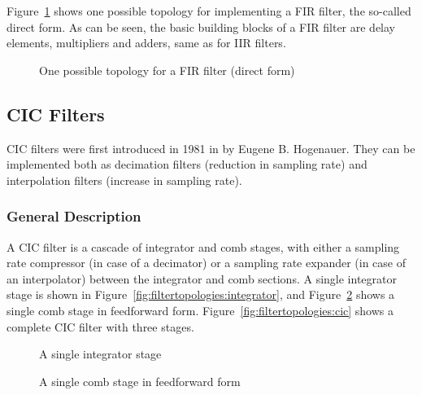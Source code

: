 Figure~\ref{fig:filtertopologies:fir}   shows   one  possible   topology   for
implementing a  FIR filter,  the so-called  direct form. As  can be  seen, the
basic building  blocks of  a FIR  filter are  delay elements,  multipliers and
adders, same as for IIR filters.

\begin{figure}
    \centering
    
    \caption[FIR Filter Topology Example]
        {One possible topology for a FIR filter (direct form)}
    \label{fig:filtertopologies:fir}
\end{figure}


\subsection{CIC Filters} %
\label{subsec:CIC_filters}

CIC  filters  were  first  introduced  in 1981  in  \cite{1163535}  by  Eugene
B. Hogenauer. They can be implemented both as decimation filters (reduction in
sampling rate)  and interpolation filters (increase  in sampling rate).

\subsubsection{General Description}
\label{subsubsec:cic:general_description}

A   CIC  filter   is  a   cascade  of   integrator  and   comb  stages,   with
either   a   sampling    rate   compressor   (in   case    of   a   decimator)
or   a    sampling   rate    expander   (in    case   of    an   interpolator)
between   the   integrator   and   comb   sections.    A   single   integrator
stage   is   shown    in   Figure~\ref{fig:filtertopologies:integrator},   and
Figure~\ref{fig:filtertopologies:comb}   shows   a   single  comb   stage   in
feedforward form. Figure~\ref{fig:filtertopologies:cic}  shows a  complete CIC
filter with three stages.

\begin{figure}
    \centering
    \begin{minipage}[t][][b]{0.45\textwidth}
        \centering
        
        \caption[Integrator Stage]{A single integrator stage}
        \label{fig:filtertopologies:integrator}
    \end{minipage}
    \begin{minipage}[t][][b]{0.45\textwidth}
        \centering
        
        \caption[Comb Stage]{A single comb stage in feedforward form}
        \label{fig:filtertopologies:comb}
    \end{minipage}
\end{figure}

